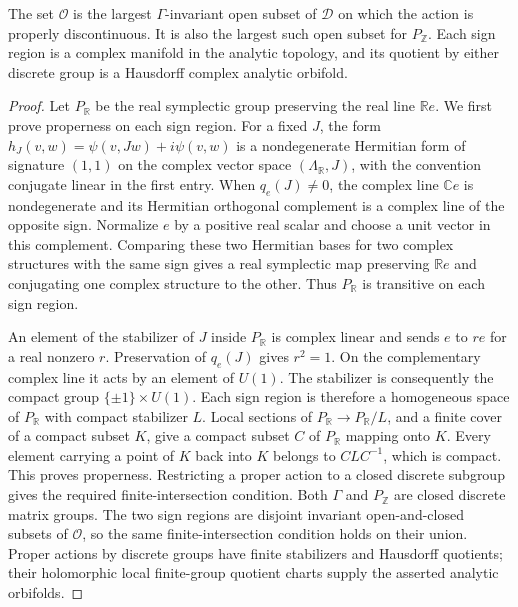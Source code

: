 \begin{theorem}\label{fam:src:F.2.2}\label{fam:st:F.2.2}
The set $\mathcal O$ is the largest $\Gamma$-invariant open subset of
$\mathcal D$ on which the action is properly discontinuous.  It is also
the largest such open subset for $P_{\mathbb Z}$.  Each sign region is
a complex manifold in the analytic topology, and its quotient by either
discrete group is a Hausdorff complex analytic orbifold.
\end{theorem}


\begin{proof}
Let $P_{\mathbb R}$ be the real symplectic group preserving the real line
$\mathbb Re$.  We first prove properness on each sign region.  For a fixed
$J$, the form
$h_J(v,w)=\psi(v,Jw)+i\psi(v,w)$ is a nondegenerate Hermitian form of
signature $(1,1)$ on the complex vector space $(\Lambda_{\mathbb R},J)$,
with the convention conjugate linear in the first entry.  When
$q_e(J)\ne0$, the complex line $\mathbb Ce$ is nondegenerate and its
Hermitian orthogonal complement is a complex line of the opposite sign.
Normalize $e$ by a positive real scalar and choose a unit vector in this
complement.  Comparing these two Hermitian bases for two complex
structures with the same sign gives a real symplectic map preserving
$\mathbb Re$ and conjugating one complex structure to the other.  Thus
$P_{\mathbb R}$ is transitive on each sign region.

An element of the stabilizer of $J$ inside $P_{\mathbb R}$ is complex
linear and sends $e$ to $r e$ for a real nonzero $r$.  Preservation of
$q_e(J)$ gives $r^2=1$.  On the complementary complex line it acts by an
element of $U(1)$.  The stabilizer is consequently the compact group
$\{\pm1\}\times U(1)$.  Each sign region is therefore a homogeneous
space of $P_{\mathbb R}$ with compact stabilizer $L$.  Local sections of
$P_{\mathbb R}\to P_{\mathbb R}/L$, and a finite cover of a compact
subset $K$, give a compact subset $C$ of $P_{\mathbb R}$ mapping onto
$K$.  Every element carrying a point of $K$ back into $K$ belongs to
$CLC^{-1}$, which is compact.  This proves properness.  Restricting a
proper action to a closed discrete subgroup gives
the required finite-intersection condition.  Both $\Gamma$ and
$P_{\mathbb Z}$ are closed discrete matrix groups.  The two sign regions
are disjoint invariant open-and-closed subsets of $\mathcal O$, so the
same finite-intersection condition holds on their union.  Proper actions
by discrete groups have finite stabilizers and Hausdorff quotients; their
holomorphic local finite-group quotient charts supply the asserted
analytic orbifolds.


\end{proof}
